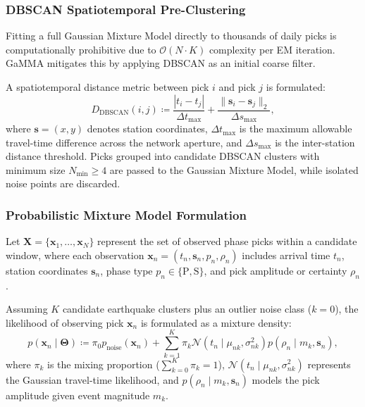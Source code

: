 \subsubsection{DBSCAN Spatiotemporal Pre-Clustering}
Fitting a full Gaussian Mixture Model directly to thousands of daily
picks is computationally prohibitive due to $\mathcal{O}(N \cdot K)$
complexity per \ac{EM} iteration. \ac{GaMMA} mitigates this by applying
\ac{DBSCAN} as an initial coarse filter.

A spatiotemporal distance metric between pick $i$ and pick $j$ is formulated:
\begin{equation}
  D_{\mathrm{DBSCAN}}(i, j) \coloneqq \frac{|t_i - t_j|}{\Delta
  t_{\mathrm{max}}} + \frac{\|\mathbf{s}_i -
  \mathbf{s}_j\|_2}{\Delta s_{\mathrm{max}}},
\end{equation}
where $\mathbf{s} = (x, y)$ denotes station coordinates, $\Delta
t_{\mathrm{max}}$ is the maximum allowable travel-time difference
across the network aperture, and $\Delta s_{\mathrm{max}}$ is the
inter-station distance threshold. Picks grouped into candidate
\ac{DBSCAN} clusters with minimum size $N_{\mathrm{min}} \ge \num{4}$ are
passed to the Gaussian Mixture Model, while isolated noise points
are discarded.

\subsubsection{Probabilistic Mixture Model Formulation}
Let $\mathbf{X} = \{\mathbf{x}_1, \dots, \mathbf{x}_N\}$ represent
the set of observed phase picks within a candidate window, where
each observation $\mathbf{x}_n = (t_n, \mathbf{s}_n, p_n, \rho_n)$
includes arrival time $t_n$, station coordinates $\mathbf{s}_n$,
phase type $p_n \in \{\mathrm{P}, \mathrm{S}\}$, and pick amplitude
or certainty $\rho_n$.

Assuming $K$ candidate earthquake clusters plus an outlier noise
class ($k = 0$), the likelihood of observing pick $\mathbf{x}_n$ is
formulated as a mixture density:
\begin{equation}
  p(\mathbf{x}_n \mid \mathbf{\Theta}) \coloneqq \pi_0
  p_{\mathrm{noise}}(\mathbf{x}_n) + \sum_{k = 1}^K \pi_k
  \mathcal{N}\left(t_n \mid \mu_{nk}, \sigma_{nk}^2\right) p(\rho_n
  \mid m_k, \mathbf{s}_n),
  \label{eq:gamma_likelihood}
\end{equation}
where $\pi_k$ is the mixing proportion ($\sum_{k = 0}^K \pi_k = \num{1}$),
$\mathcal{N}(t_n \mid \mu_{nk}, \sigma_{nk}^2)$ represents the
Gaussian travel-time likelihood, and $p(\rho_n \mid m_k,
\mathbf{s}_n)$ models the pick amplitude given event magnitude $m_k$.

